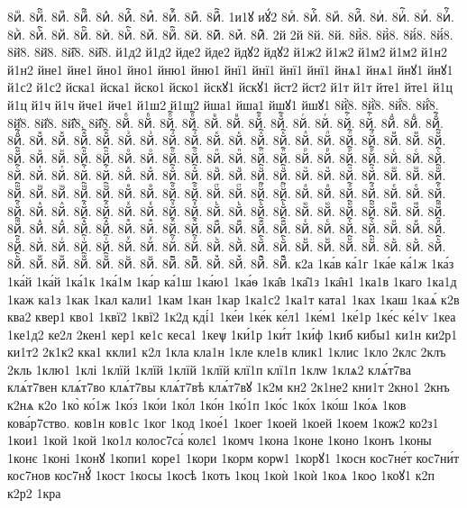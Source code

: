 {8иⷻ.
8иⷻ҇.
8иⷼ.
8иⷼ҇.
8иⷽ.
8иⷽ҇.
8иⷾ.
8иⷾ҇.
8иⷿ.
8иⷿ҇.
1и1ꙋ
иꙋ́2
8иꙴ.
8иꙴ҇.
8иꙵ.
8иꙵ҇.
8иꙶ.
8иꙶ҇.
8иꙷ.
8иꙷ҇.
8иꙸ.
8иꙸ҇.
8иꙹ.
8иꙹ҇.
8иꙺ.
8иꙺ҇.
8иꙻ.
8иꙻ҇.
8и꙼.
8и꙼҇.
8и꙽.
8и꙽҇.
2й
2й
8й.
8й.
8й̀8.
8й̀8.
8й́8.
8й́8.
8й̈8.
8й̈8.
8й̑8.
8й̑8.
й1д2
й1д2
йде2
йде2
йдꙋ2
йдꙋ2
й1ж2
й1ж2
й1м2
й1м2
й1н2
й1н2
йне1
йне1
йно1
йно1
йню1
йню1
йнї1
йнї1
йнї1
йнї1
йнѧ1
йнѧ1
йнꙋ1
йнꙋ1
й1с2
й1с2
йска1
йска1
йско1
йско1
йскꙋ1
йскꙋ1
йст2
йст2
й1т
й1т
йте1
йте1
й1ц
й1ц
й1ч
й1ч
йче1
йче1
й1ш2
й1ш2
йша1
йша1
йшꙋ1
йшꙋ1
8й҆̀8.
8й҆̀8.
8й҆́8.
8й҆́8.
8й҆̈8.
8й҆̈8.
8й҆̑8.
8й҆̑8.
8йⷠ.
8йⷠ.
8йⷠ҇.
8йⷠ҇.
8йⷡ.
8йⷡ.
8йⷡ҇.
8йⷡ҇.
8йⷢ.
8йⷢ.
8йⷢ҇.
8йⷢ҇.
8йⷣ.
8йⷣ.
8йⷣ҇.
8йⷣ҇.
8йⷤ.
8йⷤ.
8йⷤ҇.
8йⷤ҇.
8йⷥ.
8йⷥ.
8йⷥ҇.
8йⷥ҇.
8йⷦ.
8йⷦ.
8йⷦ҇.
8йⷦ҇.
8йⷧ.
8йⷧ.
8йⷧ҇.
8йⷧ҇.
8йⷨ.
8йⷨ.
8йⷨ҇.
8йⷨ҇.
8йⷩ.
8йⷩ.
8йⷩ҇.
8йⷩ҇.
8йⷪ.
8йⷪ.
8йⷪ҇.
8йⷪ҇.
8йⷫ.
8йⷫ.
8йⷫ҇.
8йⷫ҇.
8йⷬ.
8йⷬ.
8йⷬ҇.
8йⷬ҇.
8йⷭ.
8йⷭ.
8йⷭ҇.
8йⷭ҇.
8йⷮ.
8йⷮ.
8йⷮ҇.
8йⷮ҇.
8йⷯ.
8йⷯ.
8йⷯ҇.
8йⷯ҇.
8йⷰ.
8йⷰ.
8йⷰ҇.
8йⷰ҇.
8йⷱ.
8йⷱ.
8йⷱ҇.
8йⷱ҇.
8йⷲ.
8йⷲ.
8йⷲ҇.
8йⷲ҇.
8йⷳ.
8йⷳ.
8йⷳ҇.
8йⷳ҇.
8йⷴ.
8йⷴ.
8йⷴ҇.
8йⷴ҇.
8йⷵ.
8йⷵ.
8йⷵ҇.
8йⷵ҇.
8йⷶ.
8йⷶ.
8йⷶ҇.
8йⷶ҇.
8йⷷ.
8йⷷ.
8йⷷ҇.
8йⷷ҇.
8йⷸ.
8йⷸ.
8йⷸ҇.
8йⷸ҇.
8йⷹ.
8йⷹ.
8йⷹ҇.
8йⷹ҇.
8йⷺ.
8йⷺ.
8йⷺ҇.
8йⷺ҇.
8йⷻ.
8йⷻ.
8йⷻ҇.
8йⷻ҇.
8йⷼ.
8йⷼ.
8йⷼ҇.
8йⷼ҇.
8йⷽ.
8йⷽ.
8йⷽ҇.
8йⷽ҇.
8йⷾ.
8йⷾ.
8йⷾ҇.
8йⷾ҇.
8йⷿ.
8йⷿ.
8йⷿ҇.
8йⷿ҇.
8йꙴ.
8йꙴ.
8йꙴ҇.
8йꙴ҇.
8йꙵ.
8йꙵ.
8йꙵ҇.
8йꙵ҇.
8йꙶ.
8йꙶ.
8йꙶ҇.
8йꙶ҇.
8йꙷ.
8йꙷ.
8йꙷ҇.
8йꙷ҇.
8йꙸ.
8йꙸ.
8йꙸ҇.
8йꙸ҇.
8йꙹ.
8йꙹ.
8йꙹ҇.
8йꙹ҇.
8йꙺ.
8йꙺ.
8йꙺ҇.
8йꙺ҇.
8йꙻ.
8йꙻ.
8йꙻ҇.
8йꙻ҇.
8й꙼.
8й꙼.
8й꙼҇.
8й꙼҇.
8й꙽.
8й꙽.
8й꙽҇.
8й꙽҇.
к2а
1ка́в
ка́1г
1ка́е
ка́1ж
1ка́з
1ка́й
1ка́й
1ка́1к
1ка́1м
1ка́р
ка́1ш
1ка́ю1
1ка́ѳ
1ка̑в
1ка̑1з
1ка̑н1
1ка1в
1каго
1ка1д
1каж
ка1з
1как
1кал
кали1
1кам
1кан
1кар
1ка1с2
1ка1т
ката1
1ках
1каш
1каѧ́
к2в
ква2
квер1
кво1
1квї2
1квї2
1к2д
кді́1
1ке́и
1ке́к
ке́л1
1ке́м1
1ке́1р
1ке́с
ке́1ѵ
1кеа
1ке1д2
ке2л
2кен1
кер1
ке1с
кеса1
1кеѱ
1ки́1р
1ки́т
1ки́ф
1киб
кибы1
ки1н
ки2р1
ки1т2
2к1к2
кка1
ккли1
к2л
1кла
кла1н
1кле
кле1в
клик1
1клис
1кло
2клс
2клъ
2кль
1клю1
1клі
1клїй
1клїй
1клїй
1клїй
клї1п
клї1п
1клѡ
1клѧ2
клѧ́т7ва
клѧ́т7вен
клѧ́т7во
клѧ́т7вы
клѧ́т7вѣ
клѧ́т7вꙋ
1к2м
кн2
2к1не2
кни1т
2кно1
2кнъ
к2нѧ
к2о
1ко̀
ко́1ж
1ко́з
1ко́и
1ко́л
1ко́н
1ко́1п
1ко́с
1ко́х
1ко́ш
1ко́ѧ
1ков
кова́р7ство.
ков1н
ков1с
1ког
1код
1кое́1
1коег
1коей
1коей
1коем
1кож2
ко2з1
1кои1
1кой
1кой
1ко1л
колос7са́
колє1
1комч
1кона
1коне
1коно
1конъ
1коны
1конє
1коні
1конꙋ
1копи1
коре1
1кори
1корм
корѡ1
1корꙋ1
1косн
кос7не́т
кос7ни́т
кос7нов
кос7нꙋ́
1кост
1косы
1косѣ
1коть
1коц
1коѝ
1коѝ
1коѧ
1коѻ
1коꙋ1
к2п
к2р2
1кра
}
